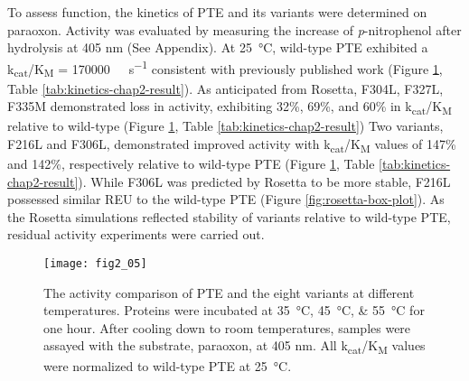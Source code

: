 \begin{refsection}
To assess function, the kinetics of PTE and its variants were determined on
paraoxon. Activity was evaluated by measuring the increase of
\emph{p}-nitrophenol after hydrolysis at 405 nm
\cite{Baker2011b,Yang2014a,Carr1996b,Cho2004b} (See Appendix). At
\SI{25}{\celsius}, wild-type PTE exhibited a
k\textsubscript{cat}/K\textsubscript{M} = \SI{170000}{\per\Molar\per\second}
consistent with previously published work \cite{Yang2014a,Baker2011b} (Figure
\ref{fig:activity-chart}, Table \ref{tab:kinetics-chap2-result}). As
anticipated from Rosetta, F304L, F327L, F335M demonstrated loss in activity,
exhibiting 32\%, 69\%, and 60\% in
k\textsubscript{cat}/K\textsubscript{M} relative to wild-type (Figure
\ref{fig:activity-chart}, Table \ref{tab:kinetics-chap2-result}) Two variants,
F216L and F306L, demonstrated improved activity with
k\textsubscript{cat}/K\textsubscript{M} values of 147\% and 142\%, respectively
relative to wild-type PTE (Figure \ref{fig:activity-chart}, Table
\ref{tab:kinetics-chap2-result}). While F306L was predicted by Rosetta to be
more stable, F216L possessed similar REU to the wild-type PTE (Figure
\ref{fig:rosetta-box-plot}). As the Rosetta simulations reflected stability of
variants relative to wild-type PTE, residual activity experiments were carried
out.
\begin{figure}[htbp] \centering \texttt{[image: fig2\_05]}
    \caption[The activity comparison of PTE and the eight variants at different
        temperatures. Proteins were incubated at \SIlist{35;45;55}{\celsius}
        for one hour. After cooling down to room temperatures, samples were
    assayed with the substrate, paraoxon, at 405 nm. All
k\textsubscript{cat}/K\textsubscript{M} values were normalized to wild-type PTE
at \SI{25}{\celsius}.]{The activity comparison of PTE and the eight variants at
    different temperatures. Proteins were incubated at
    \SIlist{35;45;55}{\celsius} for one hour. After cooling down to room
    temperatures, samples were assayed with the substrate, paraoxon, at 405 nm.
    All k\textsubscript{cat}/K\textsubscript{M} values were normalized to
    wild-type PTE at \SI{25}{\celsius}.} \label{fig:activity-chart}
\end{figure}


\end{refsection}
